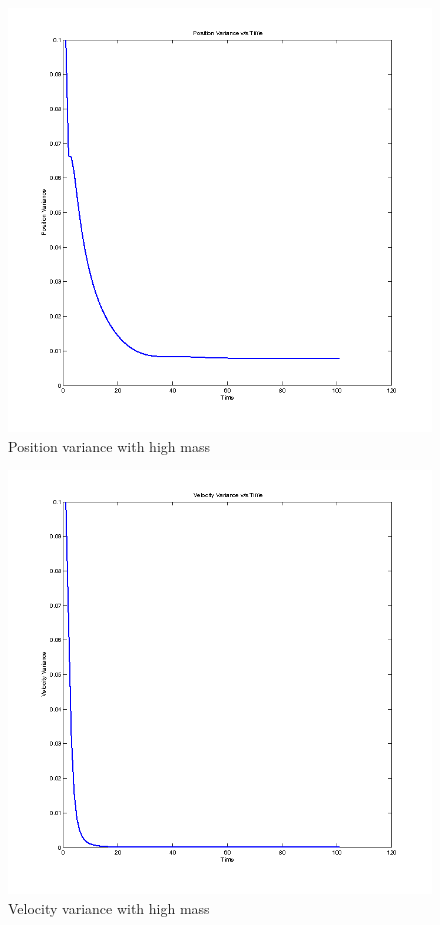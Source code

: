 \documentclass[12pt,english]{article}
\begin{document}
\begin{figure}
    \includegraphics[width=\linewidth]{kalman-variance1-m100}
    \caption{Position variance with high mass}
\end{figure}

\begin{figure}
    \includegraphics[width=\linewidth]{kalman-variance2-m100}
    \caption{Velocity variance with high mass}
\end{figure}
\end{document}
